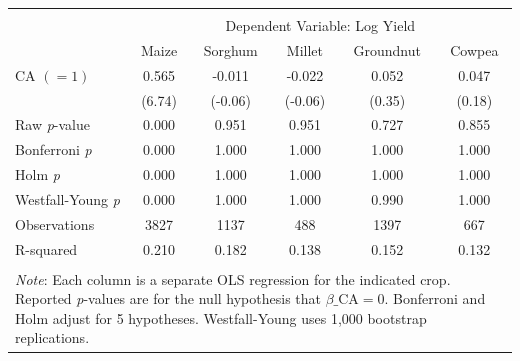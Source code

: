 \begin{tabular}{l*{5}{c}} 
\\[-1.8ex]\hline \hline \\[-1.8ex] 
& \multicolumn{5}{c}{Dependent Variable: 
Log Yield} \\ \midrule
                    &\multicolumn{1}{c}{Maize}&\multicolumn{1}{c}{Sorghum}&\multicolumn{1}{c}{Millet}&\multicolumn{1}{c}{Groundnut}&\multicolumn{1}{c}{Cowpea}\\
\midrule
\hspace{0.1cm} CA $(=1)$&       0.565&      -0.011&      -0.022&       0.052&       0.047\\
                    &      (6.74)&     (-0.06)&     (-0.06)&      (0.35)&      (0.18)\\
\midrule
Raw \textit{p}-value&       0.000&       0.951&       0.951&       0.727&       0.855\\
Bonferroni \textit{p}&       0.000&       1.000&       1.000&       1.000&       1.000\\
Holm \textit{p}     &       0.000&       1.000&       1.000&       1.000&       1.000\\
Westfall-Young \textit{p}&       0.000&       1.000&       1.000&       0.990&       1.000\\
\midrule Observations&        3827&        1137&         488&        1397&         667\\
R-squared           &       0.210&       0.182&       0.138&       0.152&       0.132\\
\hline \hline \\[-1.8ex] 
\multicolumn{6}{p{\linewidth}}{\small 
\noindent \textit{Note}: Each column is a 
separate OLS regression for the indicated 
crop. Reported \textit{p}-values are for 
the null hypothesis that 
$\beta\_{\text{CA}} = 0$. 
Bonferroni and Holm adjust for 5 
hypotheses. Westfall-Young uses 1,000 
bootstrap replications.} 
\end{tabular}

